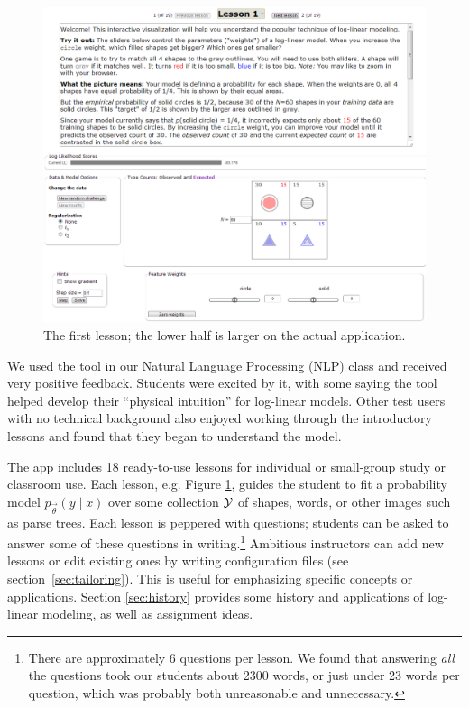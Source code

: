 \documentclass[11pt,letterpaper]{article}
\newcommand{\Note}[1]{}
\renewcommand{\Note}[1]{\hl{[#1]}}  %
\newcommand{\NoteSigned}[3]{{\sethlcolor{#2}\Note{#1: #3}}}
\newcommand{\NoteFF}[1]{\NoteSigned{FF}{LightBlue}{#1}}
\newcommand{\NoteJE}[1]{\NoteSigned{JE}{LightGreen}{#1}}
\newcommand{\NumLessons}[0]{18}%
\begin{document}
\begin{figure}
\centering
\includegraphics[scale=.49]{images/lesson1-051313-intro-zoom-instmore.PNG}
\caption{The first lesson; the lower half is larger on the actual
  application.}
\label{fig:lesson1}
\end{figure}

We used the tool in our Natural Language Processing (NLP) class and received
very positive feedback.  Students were excited by it, with some saying
the tool helped develop their ``physical intuition'' for log-linear
models.
Other test users with no 
technical background also enjoyed working
through the introductory lessons and found that they began to understand 
the model.

The app includes \NumLessons{} ready-to-use lessons for individual or
small-group study or classroom use.  Each lesson, e.g. Figure
\ref{fig:lesson1}, guides the student to fit a probability model $p_{\vec{\theta}}(y \mid
x)$ over some collection ${\cal Y}$ of shapes, words, or other images
such as parse trees.  Each lesson is peppered with questions; students
can be asked to answer some of these questions in
writing.\footnote{There are approximately 6 questions per lesson. We
  found that answering {\em all} the questions took our students about
  2300 words, or just under 23 words per question, which was probably
  both unreasonable and unnecessary.}  Ambitious instructors can add new
lessons or edit existing ones by writing configuration files (see
section~\ref{sec:tailoring}). This is useful for emphasizing specific
concepts or applications.
Section \ref{sec:history} provides some history and applications of log-linear
modeling, as well as assignment ideas.
\end{document}
